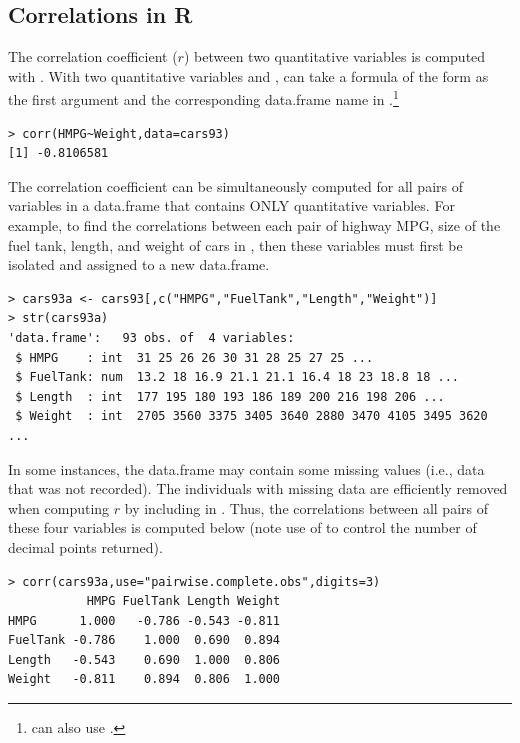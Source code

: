 \documentclass[10pt,openany]{book}\usepackage[]{graphicx}\usepackage[]{color}
\makeatletter
\newenvironment{kframe}{%
 \def\at@end@of@kframe{}%
 \ifinner\ifhmode%
  \def\at@end@of@kframe{\end{minipage}}%
  \begin{minipage}{\columnwidth}%
 \fi\fi%
 \def\FrameCommand##1{\hskip\@totalleftmargin \hskip-\fboxsep
 \colorbox{shadecolor}{##1}\hskip-\fboxsep
     \hskip-\linewidth \hskip-\@totalleftmargin \hskip\columnwidth}%
 \MakeFramed {\advance\hsize-\width
   \@totalleftmargin\z@ \linewidth\hsize
   \@setminipage}}%
 {\par\unskip\endMakeFramed%
 \at@end@of@kframe}
\newenvironment{knitrout}{}{} %
\makeatother
\begin{document}
\subsection{Correlations in R}
\vspace{-12pt}
 \label{sect:Correlation}
The correlation coefficient ($r$) between two quantitative variables is computed with . With two quantitative variables  and ,  can take a formula of the form  as the first argument and the corresponding data.frame name in .\footnote{ can also use .}
\begin{knitrout}
\color{fgcolor}\begin{kframe}
\begin{verbatim}
> corr(HMPG~Weight,data=cars93)
[1] -0.8106581
\end{verbatim}
\end{kframe}
\end{knitrout}

The correlation coefficient can be simultaneously computed for all pairs of variables in a data.frame that contains ONLY quantitative variables. For example, to find the correlations between each pair of highway MPG, size of the fuel tank, length, and weight of cars in , then these variables must first be isolated and assigned to a new data.frame.
\begin{knitrout}
\color{fgcolor}\begin{kframe}
\begin{verbatim}
> cars93a <- cars93[,c("HMPG","FuelTank","Length","Weight")]
> str(cars93a)
'data.frame':	93 obs. of  4 variables:
 $ HMPG    : int  31 25 26 26 30 31 28 25 27 25 ...
 $ FuelTank: num  13.2 18 16.9 21.1 21.1 16.4 18 23 18.8 18 ...
 $ Length  : int  177 195 180 193 186 189 200 216 198 206 ...
 $ Weight  : int  2705 3560 3375 3405 3640 2880 3470 4105 3495 3620 ...
\end{verbatim}
\end{kframe}
\end{knitrout}

In some instances, the data.frame may contain some missing values (i.e., data that was not recorded).  The individuals with missing data are efficiently removed when computing $r$ by including  in .  Thus, the correlations between all pairs of these four variables is computed below (note use of  to control the number of decimal points returned).
\begin{knitrout}
\color{fgcolor}\begin{kframe}
\begin{verbatim}
> corr(cars93a,use="pairwise.complete.obs",digits=3)
           HMPG FuelTank Length Weight
HMPG      1.000   -0.786 -0.543 -0.811
FuelTank -0.786    1.000  0.690  0.894
Length   -0.543    0.690  1.000  0.806
Weight   -0.811    0.894  0.806  1.000
\end{verbatim}
\end{kframe}
\end{knitrout}
\end{document}

